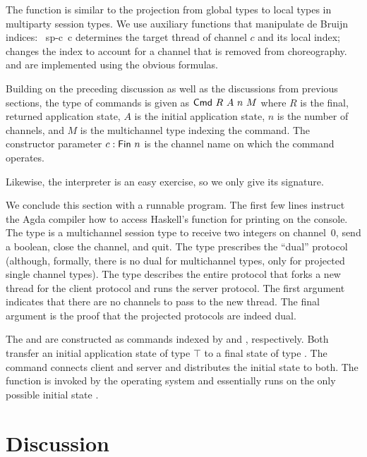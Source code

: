 \documentclass[acmsmall,review,anonymous,screen]{acmart}
\begin{document}
The function {\Aproject} is similar to the projection from global
types to local types in multiparty session types. We use
auxiliary functions that manipulate de Bruijn indices:
{\AlocateSplit~sp-c~c} determines the target thread of channel $c$ and
its local index; {\Aadjust} changes the index to account for a channel
that is removed from choreography. {\ACausality} and {\ACheckDual} are
implemented using the obvious formulas.
\multiProjection

Building on the preceding discussion as well as the discussions from previous
sections, the type of commands is given as $\ACommand~R~A~n~M$ where
$R$ is the final, returned application state, $A$ is the initial
application state, $n$ is the number of channels, and $M$ is the
multichannel type indexing the command. The constructor parameter $c : \AFin~n$ is
the channel name on which the command operates.

\multiCmd

Likewise, the interpreter {\Aexec} is an easy exercise, so we only
give its signature.

\multiExecSignature


We conclude this section with a runnable program.
\EXMbody
The first few lines instruct the Agda compiler how to access Haskell's
function {\AputStrLn} for printing on the console.
The type {\Aserverp} is a multichannel session type to receive two integers on channel~0, send a boolean,
close the channel, and quit. The type {\Aclientp} prescribes the ``dual''
protocol (although, formally, there is no dual for multichannel types,
only for projected single channel types). The type {\Aprotocol}
describes the entire protocol that forks a new thread for the client
protocol and runs the server protocol. The first argument {\Anull}
indicates that there are no channels to pass to the new thread. The final argument {\Arefl} is
the proof that the projected protocols are indeed dual.

The {\Aserver} and {\Aclient} are constructed as commands indexed by
{\Aserverp} and {\Aclientp}, respectively. Both transfer an initial
application state of type $\top$ to a final state of type
{\ABool}. The {\Asystem} command connects client  and server and
distributes the initial state to both. The {\Amain} function is
invoked by the operating system and essentially runs {\Asystem} on the
only possible initial state {\Att}.

\section{Discussion}
\label{sec:discussion}
\end{document}
